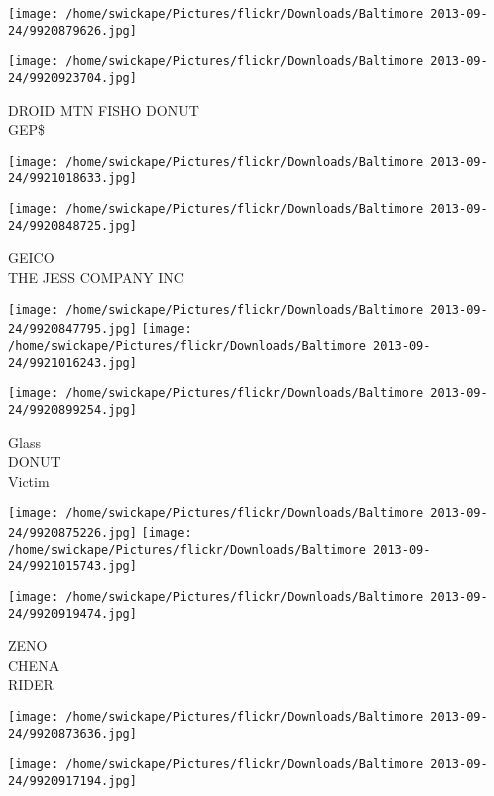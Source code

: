 \documentclass[10pt,letterpaper]{article}
\begin{document}
\texttt{[image: /home/swickape/Pictures/flickr/Downloads/Baltimore 2013-09-24/9920879626.jpg]}

\vspace{0.25in}
\texttt{[image: /home/swickape/Pictures/flickr/Downloads/Baltimore 2013-09-24/9920923704.jpg]}

DROID MTN FISHO DONUT\\
GEP\$
\pagebreak

\texttt{[image: /home/swickape/Pictures/flickr/Downloads/Baltimore 2013-09-24/9921018633.jpg]}

\vspace{0.25in}
\texttt{[image: /home/swickape/Pictures/flickr/Downloads/Baltimore 2013-09-24/9920848725.jpg]}

GEICO\\
THE JESS COMPANY INC
\pagebreak

\texttt{[image: /home/swickape/Pictures/flickr/Downloads/Baltimore 2013-09-24/9920847795.jpg]}
\texttt{[image: /home/swickape/Pictures/flickr/Downloads/Baltimore 2013-09-24/9921016243.jpg]}

\vspace{0.25in}
\texttt{[image: /home/swickape/Pictures/flickr/Downloads/Baltimore 2013-09-24/9920899254.jpg]}

Glass\\
DONUT\\
Victim
\pagebreak

\texttt{[image: /home/swickape/Pictures/flickr/Downloads/Baltimore 2013-09-24/9920875226.jpg]}
\texttt{[image: /home/swickape/Pictures/flickr/Downloads/Baltimore 2013-09-24/9921015743.jpg]}

\vspace{0.25in}
\texttt{[image: /home/swickape/Pictures/flickr/Downloads/Baltimore 2013-09-24/9920919474.jpg]}

ZENO\\
CHENA\\
RIDER
\pagebreak

\texttt{[image: /home/swickape/Pictures/flickr/Downloads/Baltimore 2013-09-24/9920873636.jpg]}

\vspace{0.25in}
\texttt{[image: /home/swickape/Pictures/flickr/Downloads/Baltimore 2013-09-24/9920917194.jpg]}
\end{document}
